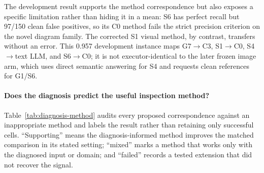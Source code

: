 \documentclass[11pt]{article}
\newcommand{\g}[1]{\textsf{#1}}
\begin{document}
The development result supports the method correspondence but also exposes a
specific limitation rather than hiding it in a mean: \g{S6} has perfect recall
but 97/150 clean false positives, so its C0 method fails the strict precision
criterion on the novel diagram family. The corrected \g{S1} visual method, by
contrast, transfers without an error. This 0.957 development instance maps
\g{G7}$\to$C3, \g{S1}$\to$C0, \g{S4}$\to$text LLM, and
\g{S6}$\to$C0; it is not executor-identical to the later frozen image arm,
which uses direct semantic answering for \g{S4} and requests clean references
for \g{G1}/\g{S6}.

\paragraph{Does the diagnosis predict the useful inspection method?}
Table~\ref{tab:diagnosis-method} audits every proposed correspondence against
an inappropriate method and labels the result rather than retaining only
successful cells. ``Supporting'' means the diagnosis-informed method improves the
matched comparison in its stated setting; ``mixed'' marks a method that works
only with the diagnosed input or domain; and ``failed'' records a tested
extension that did not recover the signal.
\end{document}
